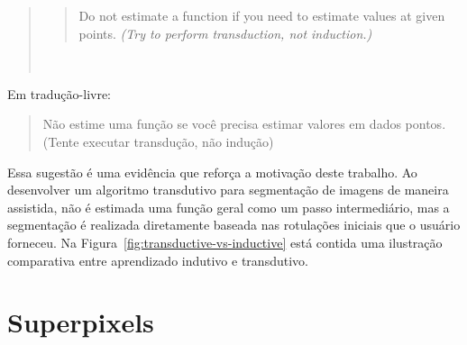 \begin{quote}

  \blockquote{Do not estimate a function if you need to estimate values at given
  points. \textit{(Try to perform transduction, not induction.)}}~\cite[p.~472]{vapnik2006semi}

\end{quote}

Em tradução-livre: \blockquote{Não estime uma função se você precisa
estimar valores em dados pontos. (Tente executar transdução, não
indução)}. Essa sugestão é uma evidência que reforça a motivação deste
trabalho. Ao desenvolver um algoritmo transdutivo para segmentação de
imagens de maneira assistida, não é estimada uma função geral como um
passo intermediário, mas a segmentação é realizada diretamente baseada
nas rotulações iniciais que o usuário forneceu. Na
Figura~\ref{fig:transductive-vs-inductive} está contida uma ilustração
comparativa entre aprendizado indutivo e transdutivo.

\begin{figure}[h!]
        \captionsetup{width=14cm}
		\centering
        {}
\end{figure}


\section{Superpixels}\label{sec:teorica-superpixel}

